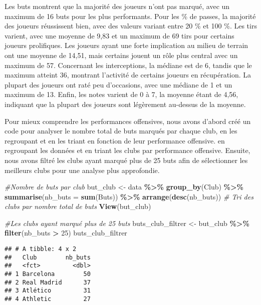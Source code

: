 \documentclass[
]{article}
\newenvironment{Shaded}{\begin{snugshade}}{\end{snugshade}}
\newcommand{\AttributeTok}[1]{\textcolor[rgb]{0.13,0.29,0.53}{#1}}
\newcommand{\CommentTok}[1]{\textcolor[rgb]{0.56,0.35,0.01}{\textit{#1}}}
\newcommand{\DecValTok}[1]{\textcolor[rgb]{0.00,0.00,0.81}{#1}}
\newcommand{\FunctionTok}[1]{\textcolor[rgb]{0.13,0.29,0.53}{\textbf{#1}}}
\newcommand{\NormalTok}[1]{#1}
\newcommand{\OtherTok}[1]{\textcolor[rgb]{0.56,0.35,0.01}{#1}}
\newcommand{\SpecialCharTok}[1]{\textcolor[rgb]{0.81,0.36,0.00}{\textbf{#1}}}
\begin{document}
Les buts montrent que la majorité des joueurs n'ont pas marqué, avec un
maximum de 16 buts pour les plus performants. Pour les \% de passes, la
majorité des joueurs réussissent bien, avec des valeurs variant entre 20
\% et 100 \%. Les tirs varient, avec une moyenne de 9,83 et un maximum
de 69 tirs pour certains joueurs prolifiques. Les joueurs ayant une
forte implication au milieu de terrain ont une moyenne de 14,51, mais
certains jouent un rôle plus central avec un maximum de 57. Concernant
les interceptions, la médiane est de 6, tandis que le maximum atteint
36, montrant l'activité de certains joueurs en récupération. La plupart
des joueurs ont raté peu d'occasions, avec une médiane de 1 et un
maximum de 13. Enfin, les notes varient de 0 à 7, la moyenne étant de
4,56, indiquant que la plupart des joueurs sont légèrement au-dessus de
la moyenne.

Pour mieux comprendre les performances offensives, nous avons d'abord
créé un code pour analyser le nombre total de buts marqués par chaque
club, en les regroupant et en les triant en fonction de leur performance
offensive. en regroupant les données et en triant les clubs par
performance offensive. Ensuite, nous avons filtré les clubs ayant marqué
plus de 25 buts afin de sélectionner les meilleurs clubs pour une
analyse plus approfondie.

\begin{Shaded}
\begin{Highlighting}[]
\CommentTok{\#Nombre de buts par club}
\NormalTok{but\_club }\OtherTok{\textless{}{-}}\NormalTok{ data }\SpecialCharTok{\%\textgreater{}\%}
  \FunctionTok{group\_by}\NormalTok{(Club) }\SpecialCharTok{\%\textgreater{}\%} 
  \FunctionTok{summarise}\NormalTok{(}\AttributeTok{nb\_buts =} \FunctionTok{sum}\NormalTok{(Buts)) }\SpecialCharTok{\%\textgreater{}\%} 
  \FunctionTok{arrange}\NormalTok{(}\FunctionTok{desc}\NormalTok{(nb\_buts))  }\CommentTok{\# Tri des clubs par nombre total de buts}
\FunctionTok{View}\NormalTok{(but\_club)}

\CommentTok{\#Les clubs ayant marqué plus de 25 buts}
\NormalTok{buts\_club\_filtrer }\OtherTok{\textless{}{-}}\NormalTok{ but\_club }\SpecialCharTok{\%\textgreater{}\%} 
  \FunctionTok{filter}\NormalTok{(nb\_buts }\SpecialCharTok{\textgreater{}} \DecValTok{25}\NormalTok{)}
\NormalTok{buts\_club\_filtrer}
\end{Highlighting}
\end{Shaded}

\begin{verbatim}
## # A tibble: 4 x 2
##   Club        nb_buts
##   <fct>         <dbl>
## 1 Barcelona        50
## 2 Real Madrid      37
## 3 Atlético         31
## 4 Athletic         27
\end{verbatim}
\end{document}
